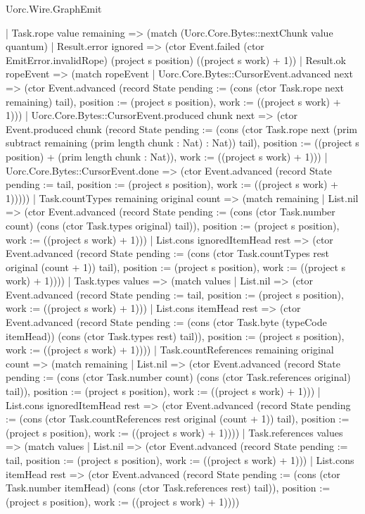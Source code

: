 \begin{lexlean}{Uorc.Wire.GraphEmit}
\begin{semanticmodule}
{      | Task.rope value remaining => (match (Uorc.Core.Bytes::nextChunk value quantum)
        | Result.error ignored => (ctor Event.failed (ctor EmitError.invalidRope) (project s position) ((project s work) + 1))
        | Result.ok ropeEvent => (match ropeEvent
          | Uorc.Core.Bytes::CursorEvent.advanced next => (ctor Event.advanced (record State {pending := (cons (ctor Task.rope next remaining) tail), position := (project s position), work := ((project s work) + 1)}))
          | Uorc.Core.Bytes::CursorEvent.produced chunk next => (ctor Event.produced chunk (record State {pending := (cons (ctor Task.rope next (prim subtract remaining (prim length chunk : Nat) : Nat)) tail), position := ((project s position) + (prim length chunk : Nat)), work := ((project s work) + 1)}))
          | Uorc.Core.Bytes::CursorEvent.done => (ctor Event.advanced (record State {pending := tail, position := (project s position), work := ((project s work) + 1)}))))
      | Task.countTypes remaining original count => (match remaining
        | List.nil => (ctor Event.advanced (record State {pending := (cons (ctor Task.number count) (cons (ctor Task.types original) tail)), position := (project s position), work := ((project s work) + 1)}))
        | List.cons ignoredItemHead rest => (ctor Event.advanced (record State {pending := (cons (ctor Task.countTypes rest original (count + 1)) tail), position := (project s position), work := ((project s work) + 1)})))
      | Task.types values => (match values
        | List.nil => (ctor Event.advanced (record State {pending := tail, position := (project s position), work := ((project s work) + 1)}))
        | List.cons itemHead rest => (ctor Event.advanced (record State {pending := (cons (ctor Task.byte (typeCode itemHead)) (cons (ctor Task.types rest) tail)), position := (project s position), work := ((project s work) + 1)})))
      | Task.countReferences remaining original count => (match remaining
        | List.nil => (ctor Event.advanced (record State {pending := (cons (ctor Task.number count) (cons (ctor Task.references original) tail)), position := (project s position), work := ((project s work) + 1)}))
        | List.cons ignoredItemHead rest => (ctor Event.advanced (record State {pending := (cons (ctor Task.countReferences rest original (count + 1)) tail), position := (project s position), work := ((project s work) + 1)})))
      | Task.references values => (match values
        | List.nil => (ctor Event.advanced (record State {pending := tail, position := (project s position), work := ((project s work) + 1)}))
        | List.cons itemHead rest => (ctor Event.advanced (record State {pending := (cons (ctor Task.number itemHead) (cons (ctor Task.references rest) tail)), position := (project s position), work := ((project s work) + 1)})))
}
\end{semanticmodule}
\end{lexlean}
